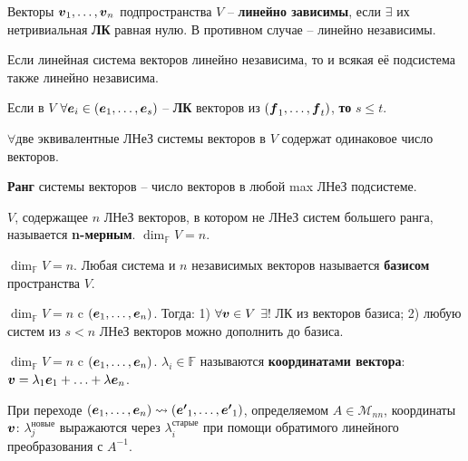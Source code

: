\begin{to_def}
	Векторы $\mbox{\boldmath $v$}_1, \ldots, \mbox{\boldmath $v$}_n$ подпространства $V$ -- \textbf{линейно зависимы}, если $\exists$ их нетривиальная \textbf{ЛК} равная нулю. В противном случае -- линейно независимы.
\end{to_def}

\begin{to_thr}
	Если линейная система векторов линейно независима, то и всякая её подсистема также линейно независима.
\end{to_thr}	

\begin{to_thr}
	Если в $V$ $\forall \mbox{\boldmath $e$}_i \in (\mbox{\boldmath $e$}_1,\ldots,\mbox{\boldmath $e$}_s)$ -- \textbf{ЛК} векторов из $(\mbox{\boldmath $f$}_1,\ldots,\mbox{\boldmath $f$}_t)$, \textbf{то} $s \leq t$.
\end{to_thr}

\begin{to_con}
	$\forall$две эквивалентные ЛНеЗ системы векторов в $V$ содержат одинаковое число векторов.
\end{to_con}

\begin{to_def}
	\textbf{Ранг} системы векторов -- число векторов в любой max ЛНеЗ подсистеме.
\end{to_def}

\begin{to_def}
	$V$, содержащее $n$ ЛНеЗ векторов, в котором не ЛНеЗ систем большего ранга, называется \textbf{n-мерным}. $\dim_\mathbb{F} V = n$. 
\end{to_def}

\begin{to_def}
	$\dim_\mathbb{F} V = n$. Любая система и $n$ независимых векторов называется \textbf{базисом} пространства $V$.
\end{to_def}

\begin{to_thr}
	$\dim_\mathbb{F} V = n$ c $( \mbox{\boldmath $e$}_1,\ldots,\mbox{\boldmath $e$}_n)$. Тогда: 1) $\forall \mbox{\boldmath $v$} \in V$ $\exists!$ ЛК из векторов базиса; 2) любую систем из $s<n$ ЛНеЗ векторов можно дополнить до базиса. 
\end{to_thr}

\begin{to_def}
	$\dim_\mathbb{F} V = n$ c $( \mbox{\boldmath $e$}_1,\ldots,\mbox{\boldmath $e$}_n)$. $\lambda_i \in \mathbb{F}$ называются \textbf{координатами вектора}: $\mbox{\boldmath $v$} = \lambda_1 \mbox{\boldmath $e$}_1 + \ldots + \lambda \mbox{\boldmath $e$}_n$. 
\end{to_def}

\begin{to_thr}
	При переходе $(\mbox{\boldmath $e$}_1,\ldots,\mbox{\boldmath $e$}_n) \leadsto ( \mbox{\boldmath $e'$}_1,\ldots,\mbox{\boldmath $e'$}_1)$, определяемом $A \in \mathcal{M}_{n n}$, координаты $\mbox{\boldmath $v$}$: $\lambda_j^\text{новые}$ выражаются через $\lambda_i^\text{старые}$ при помощи обратимого линейного преобразования с $A^{-1}$.
\end{to_thr}

